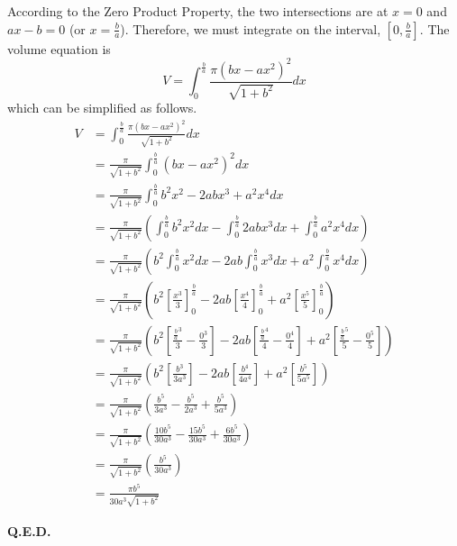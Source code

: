 \documentclass{article}
\begin{document}
According to the Zero Product Property, the two intersections are at $x=0$ and $ax-b=0$ (or $x=\tfrac{b}{a}$). Therefore, we must integrate on the interval, $\left[0,\tfrac{b}{a}\right]$. The volume equation is$$V=\int_0^{\frac{b}{a}}\frac{\pi\left(bx-ax^2\right)^2}{\sqrt{1+b^2}}dx$$which can be simplified as follows.
\begin{align*}
V &= \int_0^{\frac{b}{a}}\frac{\pi\left(bx-ax^2\right)^2}{\sqrt{1+b^2}}dx\\
   &= \frac{\pi}{\sqrt{1+b^2}}\int_0^{\frac{b}{a}}\left(bx-ax^2\right)^2dx\\
   &= \frac{\pi}{\sqrt{1+b^2}}\int_0^{\frac{b}{a}}b^2x^2-2abx^3+a^2x^4dx\\
   &= \frac{\pi}{\sqrt{1+b^2}}\left(\int_0^{\frac{b}{a}}b^2x^2dx-\int_0^{\frac{b}{a}}2abx^3dx+\int_0^{\frac{b}{a}}a^2x^4dx\right)\\
   &= \frac{\pi}{\sqrt{1+b^2}}\left(b^2\int_0^{\frac{b}{a}}x^2dx-2ab\int_0^{\frac{b}{a}}x^3dx+a^2\int_0^{\frac{b}{a}}x^4dx\right)\\
   &= \frac{\pi}{\sqrt{1+b^2}}\left(b^2\left[\frac{x^3}{3}\right]_0^{\frac{b}{a}}-2ab\left[\frac{x^4}{4}\right]_0^{\frac{b}{a}}+a^2\left[\frac{x^5}{5}\right]_0^{\frac{b}{a}}\right)\\
   &= \frac{\pi}{\sqrt{1+b^2}}\left(b^2\left[\frac{\frac{b}{a}^3}{3}-\frac{0^3}{3}\right]-2ab\left[\frac{\frac{b}{a}^4}{4}-\frac{0^4}{4}\right]+a^2\left[\frac{\frac{b}{a}^5}{5}-\frac{0^5}{5}\right]\right)\\
   &= \frac{\pi}{\sqrt{1+b^2}}\left(b^2\left[\frac{b^3}{3a^3}\right]-2ab\left[\frac{b^4}{4a^4}\right]+a^2\left[\frac{b^5}{5a^5}\right]\right)\\
   &= \frac{\pi}{\sqrt{1+b^2}}\left(\frac{b^5}{3a^3}-\frac{b^5}{2a^3}+\frac{b^5}{5a^3}\right)\\
   &= \frac{\pi}{\sqrt{1+b^2}}\left(\frac{10b^5}{30a^3}-\frac{15b^5}{30a^3}+\frac{6b^5}{30a^3}\right)\\
   &= \frac{\pi}{\sqrt{1+b^2}}\left(\frac{b^5}{30a^3}\right)\\
   &= \frac{\pi b^5}{30a^3\sqrt{1+b^2}}\tag{4}
\end{align*}\par
\begin{flushright}
\textbf{Q.E.D.}
\end{flushright}
\end{document}
